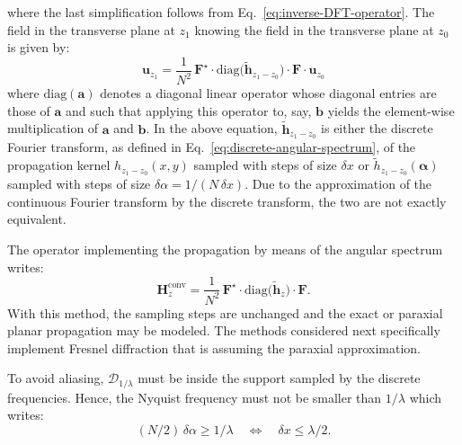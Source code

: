 \documentclass[a4paper]{article}
\newcommand{\V}[1]{\boldsymbol{#1}}
\newcommand*{\FT}[1]{\widetilde{#1}}
\begin{document}
where the last simplification follows from Eq.~\eqref{eq:inverse-DFT-operator}.
The field in the transverse plane at $z_{1}$ knowing the field in the
transverse plane at $z_{0}$ is given by:
\begin{equation}
  \label{eq:7}
  \boldsymbol{u}_{z_{1}} = \frac{1}{N^{2}}\,\mathbf{F}^{\star}·
  \mathrm{diag}\bigl(\FT{\boldsymbol{h}}_{z_{1} - z_{0}}\bigr)·
  \mathbf{F}·\boldsymbol{u}_{z_{0}}
\end{equation}
where $\mathrm{diag}(\boldsymbol{a})$ denotes a diagonal linear operator whose
diagonal entries are those of $\boldsymbol{a}$ and such that applying this
operator to, say, $\boldsymbol{b}$ yields the element-wise multiplication of
$\boldsymbol{a}$ and $\boldsymbol{b}$. In the above equation,
$\FT{\boldsymbol{h}}_{z_{1} - z_{0}}$ is either the discrete Fourier transform,
as defined in Eq.~\eqref{eq:discrete-angular-spectrum}, of the propagation
kernel $h_{z_{1} - z_{0}}(x,y)$ sampled with steps of size $δx$ or
$\FT{h}_{z_{1} - z_{0}}(\V{α})$ sampled with steps of size $δα = 1/(N\,δx)$.
Due to the approximation of the continuous Fourier transform by the discrete
transform, the two are not exactly equivalent.

The operator implementing the propagation by means of the angular spectrum
writes:
\begin{equation}
  \label{eq:angular-spectrum-propagator}
  \mathbf{H}_{z}^{\text{conv}} = \frac{1}{N^{2}}\,\mathbf{F}^{\star}·
  \mathrm{diag}\bigl(\FT{\boldsymbol{h}}_{z}\bigr)·
  \mathbf{F}.
\end{equation}
With this method, the sampling steps are unchanged and the exact or paraxial
planar propagation may be modeled. The methods considered next specifically
implement Fresnel diffraction that is assuming the paraxial approximation.

To avoid aliasing, $\mathcal{D}_{1/λ}$ must be inside the support sampled by
the discrete frequencies. Hence, the Nyquist frequency must not be smaller than
$1/λ$ which writes:
\begin{equation}
  \label{eq:no-aliasing-condition}
  (N/2)\,δα ≥ 1/λ
  \quad\Longleftrightarrow\quad
  δx ≤ λ/2.
\end{equation}
\end{document}
